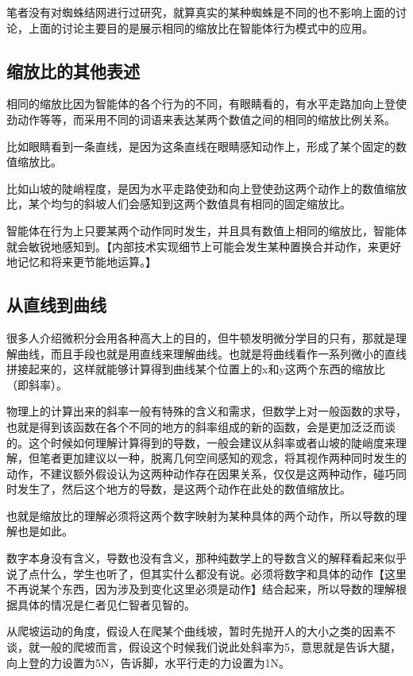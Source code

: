 \documentclass[12pt,oneside]{book}
\begin{document}
笔者没有对蜘蛛结网进行过研究，就算真实的某种蜘蛛是不同的也不影响上面的讨论，上面的讨论主要目的是展示相同的缩放比在智能体行为模式中的应用。



\subsection{缩放比的其他表述}
相同的缩放比因为智能体的各个行为的不同，有眼睛看的，有水平走路加向上登使劲动作等等，而采用不同的词语来表达某两个数值之间的相同的缩放比例关系。

比如眼睛看到一条直线，是因为这条直线在眼睛感知动作上，形成了某个固定的数值缩放比。

比如山坡的陡峭程度，是因为水平走路使劲和向上登使劲这两个动作上的数值缩放比，某个均匀的斜坡人们会感知到这两个数值具有相同的固定缩放比。

智能体在行为上只要某两个动作同时发生，并且具有数值上相同的缩放比，智能体就会敏锐地感知到。【内部技术实现细节上可能会发生某种置换合并动作，来更好地记忆和将来更节能地运算。】


\subsection{从直线到曲线}
很多人介绍微积分会用各种高大上的目的，但牛顿发明微分学目的只有，那就是理解曲线，而且手段也就是用直线来理解曲线。也就是将曲线看作一系列微小的直线拼接起来的，这样就能够计算得到曲线某个位置上的x和y这两个东西的缩放比（即斜率）。

物理上的计算出来的斜率一般有特殊的含义和需求，但数学上对一般函数的求导，也就是得到该函数在各个不同的地方的斜率组成的新的函数，会是更加泛泛而谈的。这个时候如何理解计算得到的导数，一般会建议从斜率或者山坡的陡峭度来理解，但笔者更加建议以一种，脱离几何空间感知的观念，将其视作两种同时发生的动作，不建议额外假设认为这两种动作存在因果关系，仅仅是这两种动作，碰巧同时发生了，然后这个地方的导数，是这两个动作在此处的数值缩放比。

也就是缩放比的理解必须将这两个数字映射为某种具体的两个动作，所以导数的理解也是如此。

数字本身没有含义，导数也没有含义，那种纯数学上的导数含义的解释看起来似乎说了点什么，学生也听了，但其实什么都没有说。必须将数字和具体的动作【这里不再说某个东西，因为涉及到变化这里必须是动作】结合起来，所以导数的理解根据具体的情况是仁者见仁智者见智的。

从爬坡运动的角度，假设人在爬某个曲线坡，暂时先抛开人的大小之类的因素不谈，就一般的爬坡而言，假设这个时候我们说此处斜率为5，意思就是告诉大腿，向上登的力设置为5N，告诉脚，水平行走的力设置为1N。
\end{document}

